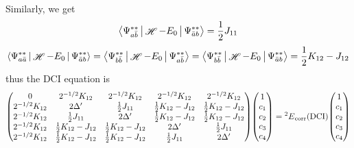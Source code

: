 \documentclass[a4paper]{article}
\DeclareMathOperator{\sH}{\mathscr{H}}
\DeclareMathOperator{\corr}{\mathrm{corr}}
\numberwithin{equation}{subsection}
\begin{document}
Similarly, we get
\begin{align}
\Braket{\Psi_{a\bar{b}}^{**} | \sH - E_0 | \Psi_{\bar{a}b}^{**}} = \dfrac{1}{2}J_{11}
\end{align}
\begin{align}
\Braket{\Psi_{a\bar{a}}^{**} | \sH - E_0 | \Psi_{\bar{a}b}^{**}} = \Braket{\Psi_{b\bar{b}}^{**} | \sH - E_0 | \Psi_{a\bar{b}}^{**}} = \Braket{\Psi_{b\bar{b}}^{**} | \sH - E_0 | \Psi_{\bar{a}b}^{**}} = \dfrac{1}{2}K_{12} - J_{12}
\end{align}
thus the DCI equation is
\begin{equation}\label{key}
\mqty(0 & 2^{-1/2}K_{12} & 2^{-1/2}K_{12} & 2^{-1/2}K_{12} & 2^{-1/2}K_{12} \\
2^{-1/2}K_{12} & 2\Delta' & \tfrac{1}{2}J_{11} & \tfrac{1}{2}K_{12} - J_{12} & \tfrac{1}{2}K_{12} - J_{12} \\
2^{-1/2}K_{12} & \tfrac{1}{2}J_{11} & 2\Delta' & \tfrac{1}{2}K_{12} - J_{12} & \tfrac{1}{2}K_{12} - J_{12} \\
2^{-1/2}K_{12} & \tfrac{1}{2}K_{12} - J_{12} & \tfrac{1}{2}K_{12} - J_{12} & 2\Delta' &\tfrac{1}{2}J_{11} \\
2^{-1/2}K_{12} & \tfrac{1}{2}K_{12} - J_{12} & \tfrac{1}{2}K_{12} - J_{12} & \tfrac{1}{2}J_{11} & 2\Delta' )
\mqty(1\\ c_1\\ c_2\\ c_3\\ c_4) = {^2 E}_{\corr}(\text{DCI}) 
\mqty(1\\ c_1\\ c_2\\ c_3\\ c_4)
\end{equation}
\end{document}
